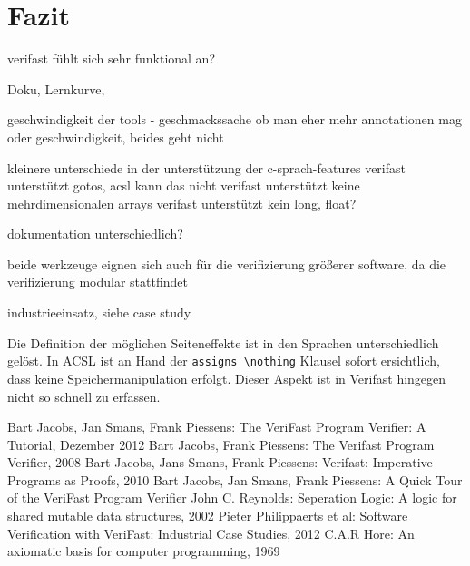 ﻿\chapter{Fazit}

verifast fühlt sich sehr funktional an?

Doku, Lernkurve, 

geschwindigkeit der tools - geschmackssache ob man eher mehr annotationen mag oder geschwindigkeit, beides geht nicht


kleinere unterschiede in der unterstützung der c-sprach-features
	verifast unterstützt gotos, acsl kann das nicht
	verifast unterstützt keine mehrdimensionalen arrays
	verifast unterstützt kein long, float?
	
dokumentation unterschiedlich?
	
beide werkzeuge eignen sich auch für die verifizierung größerer software, da die verifizierung modular stattfindet

industrieeinsatz, siehe case study

Die Definition der möglichen Seiteneffekte ist in den Sprachen unterschiedlich gelöst. In ACSL
ist an Hand der \lstinline{assigns \nothing} Klausel sofort ersichtlich, dass keine Speichermanipulation
erfolgt. Dieser Aspekt ist in Verifast hingegen nicht so schnell zu erfassen.

\begin{thebibliography}{}
 Bart Jacobs, Jan Smans, Frank Piessens: The VeriFast Program Verifier: A Tutorial, Dezember 2012
 Bart Jacobs, Frank Piessens: The Verifast Program Verifier, 2008
 Bart Jacobs, Jans Smans, Frank Piessens: Verifast: Imperative Programs as Proofs, 2010
 Bart Jacobs, Jan Smans, Frank Piessens: A Quick Tour of the VeriFast Program Verifier
 John C. Reynolds: Seperation Logic: A logic for shared mutable data structures, 2002
 Pieter Philippaerts et al: Software Verification with VeriFast: Industrial Case Studies, 2012
 C.A.R Hore: An axiomatic basis for computer programming, 1969
\end{thebibliography}